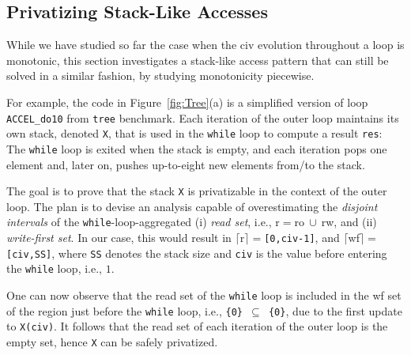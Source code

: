 \documentclass[10pt,nocopyrightspace]{sigplanconf}
\begin{document}

\enlargethispage{\baselineskip}

\subsection{Privatizing Stack-Like Accesses} 
\label{sec:Stack}

While we have studied so far the case when the {\sc civ} evolution
throughout a loop is monotonic, this section investigates a stack-like 
access pattern that can still be solved in a similar fashion, by 
studying monotonicity piecewise.
 
For example, the code in Figure~\ref{fig:Tree}(a) is a simplified
version of loop {\tt ACCEL\_do10} from {\tt tree} benchmark. 
Each iteration of the outer loop maintains its own
stack, denoted {\tt X}, that is used in the {\tt while} loop to 
compute a result {\tt res}:
The {\tt while} loop is exited when the stack is empty, and each
iteration pops one element and, later on, pushes
up-to-eight new elements from/to the stack. 

The goal is to prove that the stack {\tt X} is privatizable in the
context of the outer loop.   The plan is to devise an analysis
capable of overestimating the {\em disjoint intervals} of the
{\tt while}-loop-aggregated (i) {\em read set}, i.e., 
{\sc r}$=${\sc ro}$~\cup~${\sc rw}, and (ii) {\em write-first set}. 
In our case, this would result in  
$\lceil${\sc r}$\rceil=${\tt[0,civ-1]}, and
$\lceil${\sc wf}$\rceil=${\tt[civ,SS]}, where {\tt SS} denotes
the stack size and  {\tt civ} is the value before entering the 
{\tt while} loop, i.e., $1$.  

One can now observe that the read set of the {\tt while} loop 
is included in the {\sc wf} set of the region just before the 
{\tt while} loop, i.e., {\tt \{0\} $\subseteq$ \{0\}}, due to the 
first update to {\tt X(civ)}. It follows that the read set of
each iteration of the outer loop is the empty set, 
hence {\tt X} can be safely privatized. 
\end{document}
